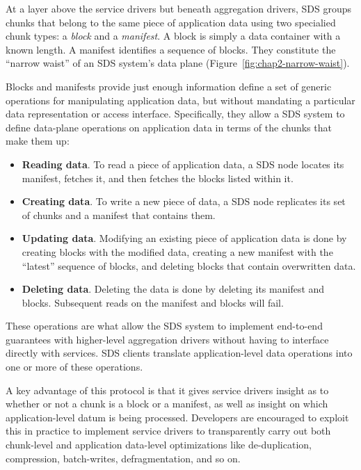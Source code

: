 At a layer above the service drivers but beneath aggregation drivers, SDS
groups chunks that belong to the same piece of application data using two specialied
chunk types:  a \emph{block} and a \emph{manifest}.  A block is simply a data
container with a known length.  A manifest identifies a sequence of blocks.
They constitute the ``narrow waist'' of an SDS system's data plane
(Figure~\ref{fig:chap2-narrow-waist}).

Blocks and manifests provide just enough information define a
set of generic operations for manipulating application data, but
without mandating a particular data representation or access interface.
Specifically, they allow a SDS system to define data-plane operations on
application data in terms of the chunks that make them up:

\begin{itemize}
   \item \textbf{Reading data}.  To read a piece of application data, a SDS node locates
    its manifest, fetches it, and then fetches the blocks listed within it.

   \item \textbf{Creating data}.  To write a new piece of data, a SDS node replicates
    its set of chunks and a manifest that contains them.

   \item \textbf{Updating data}.  Modifying an existing
    piece of application data is done by creating blocks with the modified data,
    creating a new manifest with the ``latest'' sequence of blocks, and deleting
    blocks that contain overwritten data.

   \item \textbf{Deleting data}.  Deleting the data is done by
    deleting its manifest and blocks.  Subsequent reads on the manifest and
    blocks will fail.
\end{itemize}

These operations are what allow the SDS system to implement end-to-end
guarantees with higher-level aggregation drivers without having to interface
directly with services.  SDS clients translate application-level data
operations into one or more of these operations.

A key advantage of this protocol is that it gives service drivers insight as to whether or not a
chunk is a block or a manifest, as well as insight on which application-level
datum is being processed.  Developers are encouraged to exploit this in practice to implement
service drivers to transparently carry out both chunk-level and application
data-level optimizations like de-duplication, compression, batch-writes,
defragmentation, and so on.

